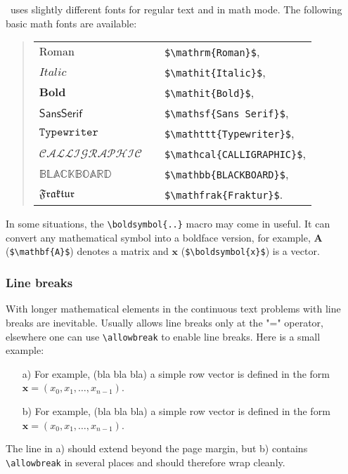 \latex\ uses slightly different fonts for regular text and in math mode.
The following basic math fonts are available:
%
\begin{quote}
    \begin{tabular}{lcl}
        $\mathrm{Roman}$      & & \verb!$\mathrm{Roman}$!,      \\
				$\mathit{Italic}$     & & \verb!$\mathit{Italic}$!,      \\
				$\mathbf{Bold}$     	& & \verb!$\mathit{Bold}$!,      \\
        $\mathsf{Sans Serif}$ & & \verb!$\mathsf{Sans Serif}$!, \\
        $\mathtt{Typewriter}$ & & \verb!$\mathttt{Typewriter}$!, \\
				$\mathcal{CALLIGRAPHIC}$ & & \verb!$\mathcal{CALLIGRAPHIC}$!,\\
				$\mathbb{BLACKBOARD}$ & & \verb!$\mathbb{BLACKBOARD}$!,\\
				$\mathfrak{Fraktur}$ & & \verb!$\mathfrak{Fraktur}$!.
    \end{tabular}
\end{quote}
%
In some situations, the \verb!\boldsymbol{..}! macro may come in useful. It can 
convert any mathematical symbol into a boldface version, for example,
$\mathbf{A}$ (\verb!$\mathbf{A}$!) denotes a matrix and $\boldsymbol{x}$ 
(\verb!$\boldsymbol{x}$!) is a vector.


\subsubsection{Line breaks}

With longer mathematical elements in the continuous text problems with line breaks 
are inevitable. Usually \latex allows line breaks only at the "=" operator, 
elsewhere one can use \verb|\allowbreak| to enable line breaks. Here is a small
example:
%
\begin{itemize}
	\item[a)] For example, (bla bla bla) a simple row vector is defined in the form
	$\boldsymbol{x} = (x_0, x_1, \ldots, x_{n-1})$.
	\item[b)] For example, (bla bla bla) a simple row vector is defined in the form
	$\boldsymbol{x} = (x_0,\allowbreak x_1,\allowbreak\ldots,\allowbreak
	x_{n-1})$.
\end{itemize}
%
The line in a) should extend beyond the page margin, but b) contains 
\verb|\allowbreak| in several places and should therefore wrap cleanly.


